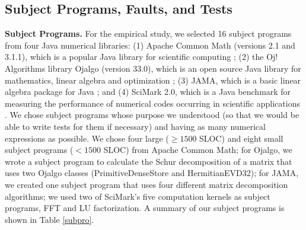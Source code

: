 \subsection{Subject Programs, Faults, and Tests}
{\bf Subject Programs.}  For the empirical study, we selected 16 subject programs from four Java numerical libraries: (1) Apache Common Math (versions 2.1 and 3.1.1), which is a popular Java library for scientific computing \cite{Commons}; (2) the Oj! Algorithms library Ojalgo (version 33.0), which is an open source Java library for mathematics, linear algebra and optimization \cite{Oj}; (3) JAMA, which is a basic linear algebra package for Java \cite{JAMA}; and (4) SciMark 2.0, which is a Java benchmark for measuring the performance of numerical codes occurring in scientific applications \cite{SciMark}.  We chose subject programs whose purpose we understood (so that we would be able to write tests for them if necessary) and having as many numerical expressions as possible.  We chose four large ($\ge 1500$ SLOC) and eight small subject programs ($< 1500$ SLOC) from Apache Common Math; for Ojalgo, we wrote a subject program to calculate the Schur decomposition of a matrix that uses two Ojalgo classes (PrimitiveDenseStore and HermitianEVD32); for JAMA, we created one subject program that uses four different matrix decomposition algorithms; we used two of SciMark's five computation kernels as subject programs, FFT and LU factorization.  A summary of our subject programs is shown in Table \ref{subpro}.

